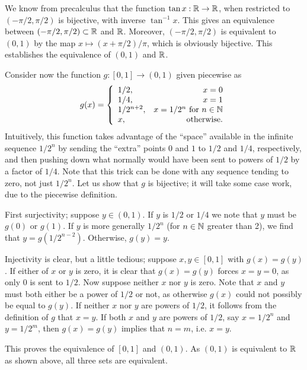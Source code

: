 \documentclass{../mathnotes}
\begin{document}
We know from precalculus that the function $\tan x:\mathbb{R}\to\mathbb{R}$, when restricted to $(-\pi/2,\pi/2)$ is bijective,
with inverse $\tan^{-1} x$. This gives an equivalence between $(-\pi/2,\pi/2)\subset\mathbb{R}$ and $\mathbb{R}$.
Moreover, $(-\pi/2,\pi/2)$ is equivalent to $(0,1)$ by the map $x\mapsto (x+\pi/2)/\pi$, which is
obviously bijective. This establishes the equivalence of $(0,1)$ and $\mathbb{R}$.

Consider now the function $g:[0,1]\to(0,1)$ given piecewise as
\begin{align*}
    g(x) = \left\{
        \begin{array}{lr}
            1/2, &  x=0\\
            1/4, &  x=1\\
            1/2^{n+2}, &  x=1/2^n\text{ for }n\in\mathbb{N}\\
            x, & \text{otherwise}.
        \end{array}
        \right.
\end{align*}
Intuitively, this function takes advantage of the ``space'' available in the infinite sequence $1/2^n$ by sending
the ``extra'' points $0$ and $1$ to $1/2$ and $1/4$, respectively, and then pushing down what
normally would have been sent to powers of $1/2$ by a factor of $1/4$.
Note that this trick can be done with any sequence tending to zero, not just $1/2^n$.
Let us show that $g$ is bijective; it will take some case work, due to the piecewise definition.

First surjectivity; suppose $y\in(0,1)$. If $y$ is $1/2$ or $1/4$ we note that $y$ must be $g(0)$ or $g(1)$. If
$y$ is more generally $1/2^n$ (for $n\in\mathbb{N}$ greater than 2), we find that $y=g(1/2^{n-2})$. Otherwise, $g(y)=y$.

Injectivity is clear, but a little tedious; suppose $x,y\in[0,1]$ with $g(x)=g(y)$.
If either of $x$ or $y$ is zero, it is clear that $g(x)=g(y)$ forces $x=y=0$, as only $0$ is sent to $1/2$.
Now suppose neither $x$ nor $y$ is zero. Note that $x$ and $y$ must both either be a power of $1/2$
or not, as otherwise $g(x)$ could not possibly be equal to $g(y)$.
If neither $x$ nor $y$ are powers of $1/2$, it follows from the definition of $g$ that $x=y$.
If both $x$ and $y$ are powers of $1/2$, say $x=1/2^n$ and $y=1/2^m$, then $g(x)=g(y)$ implies that $n=m$,
i.e. $x=y$.

This proves the equivalence of $[0,1]$ and $(0,1)$. As $(0,1)$ is equivalent to $\mathbb{R}$ as shown above,
all three sets are equivalent.
\end{document}
